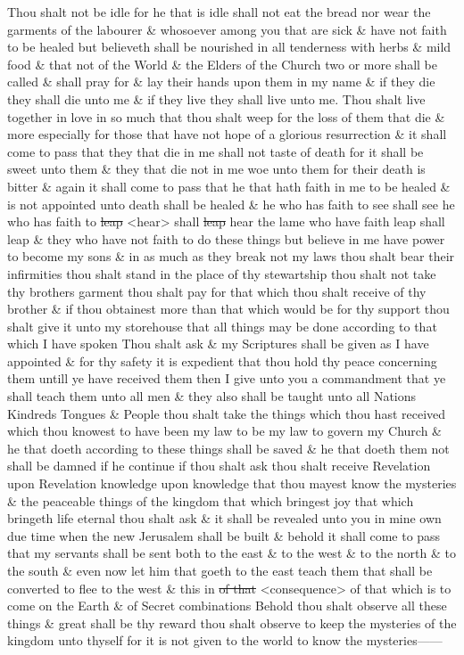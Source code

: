 			Thou shalt not be idle for he that is idle shall not eat the bread nor wear the garments of the labourer \& whosoever among you that are sick \& have not faith to be healed but believeth shall be nourished in all tenderness with herbs \& mild food \& that not of the World \& the Elders of the Church two or more shall be called \& shall pray for \& lay their hands upon them in my name \& if they die they shall die unto me \& if they live they shall live unto me. Thou shalt live together in love in so much that thou shalt weep for the loss of them that die \& more especially for those that have not hope of a glorious resurrection \& it shall come to pass that they that die in me shall not taste of death for it shall be sweet unto them \& they that die not in me woe unto them for their death is bitter \& again it shall come to pass that he that hath faith in me to be healed \& is not appointed unto death shall be healed \& he who has faith to see shall see he who has faith to \sout{leap} <hear> shall \sout{leap} hear the lame who have faith leap shall leap \& they who have not faith to do these things but believe in me have power to become my sons \& in as much as they break not my laws thou shalt bear their infirmities thou shalt stand in the place of thy stewartship thou shalt not take thy brothers garment thou shalt pay for that which thou shalt receive of thy brother \& if thou obtainest more than that which would be for thy support thou shalt give it unto my storehouse that all things may be done according to that which I have spoken Thou shalt ask \& my Scriptures shall be given as I have appointed \& for thy safety it is expedient that thou hold thy peace concerning them untill ye have received them then I give unto you a commandment that ye shall teach them unto all men \& they also shall be taught unto all Nations Kindreds Tongues \& People thou shalt take the things which thou hast received which thou knowest to have been my law to be my law to govern my Church \& he that doeth according to these things shall be saved \& he that doeth them not shall be damned if he continue if thou shalt ask thou shalt receive Revelation upon Revelation knowledge upon knowledge that thou mayest know the mysteries \& the peaceable things of the kingdom that which bringest joy that which bringeth life eternal thou shalt ask \& it shall be revealed unto you in mine own due time when the new Jerusalem shall be built \& behold it shall come to pass that my servants shall be sent both to the east \& to the west \& to the north \& to the south \& even now let him that goeth to the east teach them that shall be converted to flee to the west \& this in \sout{of that} <consequence> of that which is to come on the Earth \& of Secret combinations Behold thou shalt observe all these things \& great shall be thy reward thou shalt observe to keep the mysteries of the kingdom unto thyself for it is not given to the world to know the mysteries------

